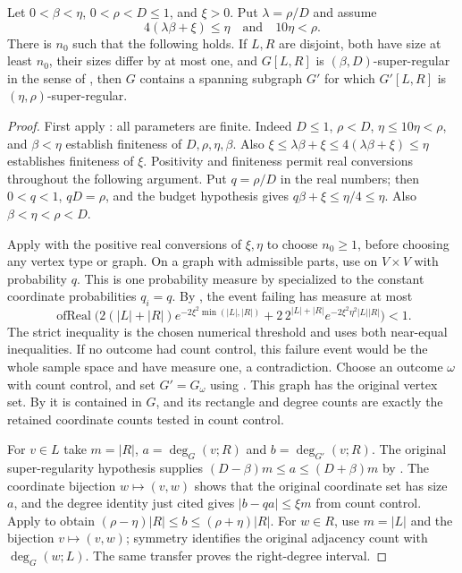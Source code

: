 \begin{lemma}
Let $0<\beta<\eta$, $0<\rho<D\leq1$, and $\xi>0$. Put $\lambda=\rho/D$ and assume
\[
4(\lambda\beta+\xi)\leq\eta\quad\text{and}\quad 10\eta<\rho.
\]
There is $n_0$ such that the following holds. If $L,R$ are disjoint, both have size at least $n_0$, their sizes differ by at most one, and $G[L,R]$ is $(\beta,D)$-super-regular in the sense of , then $G$ contains a spanning subgraph $G'$ for which $G'[L,R]$ is $(\eta,\rho)$-super-regular.
\end{lemma}
\begin{proof}
First apply : all parameters are finite. Indeed $D\leq1$, $\rho<D$,
$\eta\leq10\eta<\rho$, and $\beta<\eta$ establish finiteness of
$D,\rho,\eta,\beta$. Also
$\xi\leq\lambda\beta+\xi\leq4(\lambda\beta+\xi)\leq\eta$ establishes
finiteness of $\xi$. Positivity and finiteness permit real conversions
throughout the following argument. Put $q=\rho/D$ in the real numbers;
then $0<q<1$, $qD=\rho$, and the budget hypothesis gives
$q\beta+\xi\leq\eta/4\leq\eta$. Also $\beta<\eta<\rho<D$.

Apply  with the positive real
conversions of $\xi,\eta$ to choose $n_0\geq1$, before choosing any
vertex type or graph. On a graph with admissible parts, use
 on $V\times V$ with probability $q$.
This is one probability measure by 
specialized to the constant coordinate probabilities $q_i=q$.
By , the event failing
 has measure at most
\[
\operatorname{ofReal}\bigl(
2(|L|+|R|)e^{-2\xi^2\min(|L|,|R|)}
+2\,2^{|L|+|R|}e^{-2\xi^2\eta^2|L||R|}\bigr)<1.
\]
The strict inequality is the chosen numerical threshold and uses both
near-equal inequalities. If no outcome had count control, this failure
event would be the whole sample space and have measure one, a
contradiction. Choose an outcome $\omega$ with count control, and set
$G'=G_\omega$ using . This graph has the
original vertex set. By  it is
contained in $G$, and its rectangle and degree counts are exactly
the retained coordinate counts tested in count control.

For $v\in L$ take $m=|R|$, $a=\deg_G(v;R)$ and
$b=\deg_{G'}(v;R)$. The original super-regularity hypothesis supplies
$(D-\beta)m\leq a\leq(D+\beta)m$ by .
The coordinate bijection $w\mapsto(v,w)$ shows that the original
coordinate set has size $a$, and the degree identity just cited gives
$|b-qa|\leq\xi m$ from count control. Apply
 to obtain
$(\rho-\eta)|R|\leq b\leq(\rho+\eta)|R|$.
For $w\in R$, use $m=|L|$ and the bijection $v\mapsto(v,w)$;
symmetry identifies the original adjacency count with
$\deg_G(w;L)$. The same transfer proves the right-degree interval.


\end{proof}
